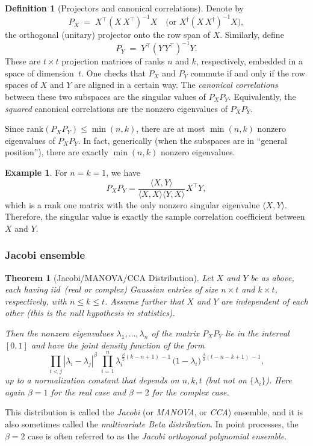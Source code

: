 \documentclass[letterpaper,11pt,oneside,reqno]{article}
\numberwithin{equation}{section}
\newcommand{\ssp}{\hspace{1pt}}
\newtheorem{theorem}[proposition]{Theorem}
\theoremstyle{definition}
\newtheorem{definition}[proposition]{Definition}
\newtheorem{example}[proposition]{Example}
\begin{document}
\begin{definition}[Projectors and canonical correlations]
Denote by
\[
  P_X \;=\; X^\top\!(X\,X^\top)^{-1}X
  \quad\bigl(\text{or }X^\dagger(X\,X^\dagger)^{-1}X\bigr),
\]
the orthogonal (unitary) projector onto the row span of \(X\).
Similarly, define
\[
  P_Y \;=\; Y^\top\!(Y\,Y^\top)^{-1}Y.
\]
These are \(t\times t\) projection matrices of ranks \(n\) and \(k\), respectively, embedded in a space of dimension~\(t\).  One checks that \(P_X\) and \(P_Y\) commute if and only if the row spaces of \(X\) and \(Y\) are aligned in a certain way.  The \emph{canonical correlations} between these two subspaces are the singular values of \(P_X P_Y\).  Equivalently, the \emph{squared} canonical correlations are the nonzero eigenvalues of \(P_X P_Y\).
\end{definition}

Since \(\mathrm{rank}(P_X P_Y)\le \min(n,k)\), there are at most \(\min(n,k)\) nonzero eigenvalues of \(P_X P_Y\).  In fact, generically
(when the subspaces are in ``general position''), there are exactly \(\min(n,k)\) nonzero eigenvalues.

\begin{example}
	For $n=k=1$, we have
	\begin{equation*}
		P_XP_Y=\frac{\langle X,Y \rangle }{\langle X,X \rangle \langle Y,X \rangle }\ssp X^\top Y,
	\end{equation*}
	which is a rank one matrix with the only nonzero singular
	eigenvalue $\langle X,Y \rangle $.
	Therefore, the singular value is exactly the sample correlation
	coefficient between $X$ and $Y$.
\end{example}

\subsubsection{Jacobi ensemble}

\begin{theorem}[Jacobi/MANOVA/CCA Distribution]
\label{thm:Jacobi_distribution}
Let \(X\) and \(Y\) be as above, each having iid\ (real
or complex) Gaussian entries of size \(n\times t\) and
\(k\times t\), respectively, with \(n\le k \le t\).  Assume
further that \(X\) and \(Y\) are independent of each other
(this
is the null hypothesis in statistics).

Then the nonzero eigenvalues \(\lambda_1,\ldots,\lambda_n\) of the matrix \(P_X P_Y\) lie in the interval \([0,1]\) and have the joint density function
of the form
\[
  \prod_{i<j} |\lambda_i - \lambda_j|^\beta
  \;\prod_{i=1}^n
  \lambda_i^{\,\frac{\beta}{2}(k-n+1)\,-1}
  \,\bigl(1-\lambda_i\bigr)^{\,\frac{\beta}{2}(t-n-k+1)\,-1},
\]
up to a normalization constant that depends on \(n,k,t\) (but not on \(\{\lambda_i\}\)).
Here again \(\beta=1\) for the real case and \(\beta=2\) for the complex case.
\end{theorem}
This distribution is called the \emph{Jacobi} (or \emph{MANOVA}, or \emph{CCA}) ensemble, and it is also sometimes called the
\emph{multivariate Beta distribution}.
In point processes, the $\beta=2$ case is often referred to as the
\emph{Jacobi orthogonal polynomial ensemble}.
\end{document}

